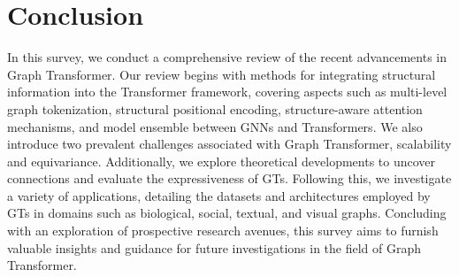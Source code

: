 \section{Conclusion}
\label{sec.conclusion}
In this survey, we conduct a comprehensive review of the recent advancements in Graph Transformer. Our review begins with methods for integrating structural information into the Transformer framework, covering aspects such as multi-level graph tokenization, structural positional encoding, structure-aware attention mechanisms, and model ensemble between GNNs and Transformers. We also introduce two prevalent challenges associated with Graph Transformer, scalability and equivariance. Additionally, we explore theoretical developments to uncover connections and evaluate the expressiveness of GTs. Following this, we investigate a variety of applications, detailing the datasets and architectures employed by GTs in domains such as biological, social, textual, and visual graphs.  Concluding with an exploration of prospective research avenues, this survey aims to furnish valuable insights and guidance for future investigations in the field of Graph Transformer.









